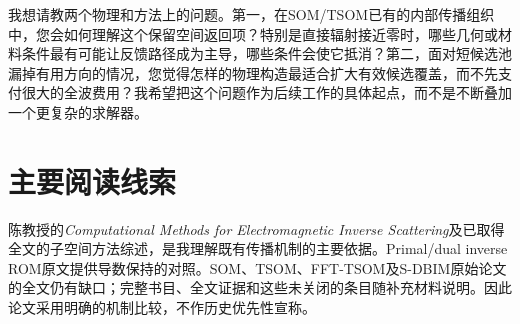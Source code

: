 \documentclass[UTF8,a4paper,11pt,fontset=none]{ctexart}
\begin{document}
我想请教两个物理和方法上的问题。第一，在SOM/TSOM已有的内部传播组织中，您会如何理解这个保留空间返回项？特别是直接辐射接近零时，哪些几何或材料条件最有可能让反馈路径成为主导，哪些条件会使它抵消？第二，面对短候选池漏掉有用方向的情况，您觉得怎样的物理构造最适合扩大有效候选覆盖，而不先支付很大的全波费用？我希望把这个问题作为后续工作的具体起点，而不是不断叠加一个更复杂的求解器。

\section*{主要阅读线索}
陈教授的\emph{Computational Methods for Electromagnetic Inverse Scattering}及已取得全文的子空间方法综述，是我理解既有传播机制的主要依据。Primal/dual inverse ROM原文提供导数保持的对照。SOM、TSOM、FFT-TSOM及S-DBIM原始论文的全文仍有缺口；完整书目、全文证据和这些未关闭的条目随补充材料说明。因此论文采用明确的机制比较，不作历史优先性宣称。
\end{document}

